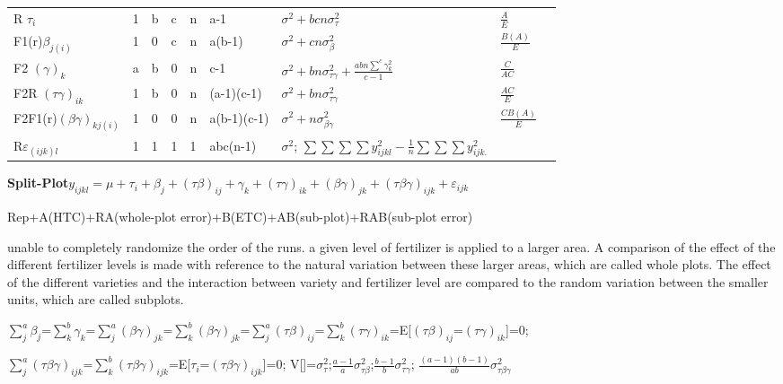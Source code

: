 \documentclass[
  10pt,
  twocolumn]{article}
\begin{document}
\begin{tabular}{ l|l|l|l|l|l|l|l|l }\hline
R $\tau_{i}$ &1&b&c&n&a-1&$\sigma^2+bcn\sigma^2_{\tau}$&$\frac{A}{E}$\\
F1(r)$\beta_{j(i)}$ &1&0&c&n&a(b-1)&$\sigma^2+cn\sigma^2_{\beta}$&$\frac{B(A)}{E}$\\
F2 $(\gamma)_{k}$ &a&b&0&n&c-1&$\sigma^2+bn\sigma^2_{\tau\gamma}+\frac{abn\sum^{c}\gamma_k^2}{c-1}$&$\frac{C}{AC}$\\
F2R $(\tau\gamma)_{ik}$ &1&b&0&n&(a-1)(c-1)&$\sigma^2+bn\sigma^2_{\tau\gamma}$&$\frac{AC}{E}$\\
F2F1(r)$(\beta\gamma)_{kj(i)}$&1&0&0&n&a(b-1)(c-1)&$\sigma^2+n\sigma^2_{\beta\gamma}$&$\frac{CB(A)}{E}$\\
R$\varepsilon_{(ijk)l}$&1&1&1&1&abc(n-1)&$\sigma^2$; $\sum\sum\sum\sum y_{ijkl}^2-\frac1n\sum\sum\sum y_{ijk.}^2$\\\hline
\end{tabular}

\textbf{Split-Plot}\(y_{ijkl}=\mu+\tau_i+\beta_{j}+(\tau\beta)_{ij}+\gamma_{k}+(\tau\gamma)_{ik}+(\beta\gamma)_{jk}+(\tau\beta\gamma)_{ijk}+\varepsilon_{ijk}\)

Rep+A(HTC)+RA(whole-plot error)+B(ETC)+AB(sub-plot)+RAB(sub-plot error)

unable to completely randomize the order of the runs. a given level of
fertilizer is applied to a larger area. A comparison of the effect of
the different fertilizer levels is made with reference to the natural
variation between these larger areas, which are called whole plots. The
effect of the different varieties and the interaction between variety
and fertilizer level are compared to the random variation between the
smaller units, which are called subplots.

\(\sum_{j}^a\beta_{j}\)=\(\sum_{k}^b\gamma_{k}\)=\(\sum_{j}^a(\beta\gamma)_{jk}\)=\(\sum_{k}^b(\beta\gamma)_{jk}\)=\(\sum_{j}^a(\tau\beta)_{ij}\)=\(\sum_{k}^b(\tau\gamma)_{ik}\)=E{[}\((\tau\beta)_{ij}\)=\((\tau\gamma)_{ik}\){]}=0;

\(\sum_{j}^a(\tau\beta\gamma)_{ijk}\)=\(\sum_{k}^b(\tau\beta\gamma)_{ijk}\)=E{[}\(\tau_i\)=\((\tau\beta\gamma)_{ijk}\){]}=0;
V{[}{]}=\(\sigma_{\tau}^2\);\(\frac{a-1}{a}\sigma_{\tau\beta}^2\);\(\frac{b-1}{b}\sigma_{\tau\gamma}^2\);
\(\frac{(a-1)(b-1)}{ab}\sigma_{\tau\beta\gamma}^2\)
\end{document}
